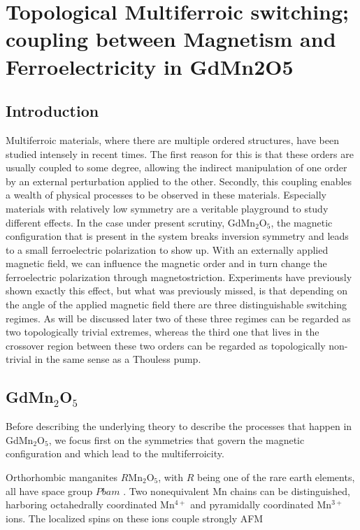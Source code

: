 \chapter{Topological Multiferroic switching; coupling between Magnetism and Ferroelectricity in GdMn2O5}
\section{Introduction}
Multiferroic materials, where there are multiple ordered structures, have been studied intensely in recent times. The first reason for this is that these orders are usually coupled to some degree, allowing the indirect manipulation of one order by an external perturbation applied to the other. Secondly, this coupling enables a wealth of physical processes to be observed in these materials. Especially materials with relatively low symmetry are a veritable playground to study different effects. In the case under present scrutiny, GdMn$_2$O$_5$, the magnetic configuration that is present in the system breaks inversion symmetry and leads to a small ferroelectric polarization to show up. With an externally applied magnetic field, we can influence the magnetic order and in turn change the ferroelectric polarization through magnetostriction. Experiments have previously shown exactly this effect, but what was previously missed, is that depending on the angle of the applied magnetic field there are three distinguishable switching regimes. As will be discussed later two of these three regimes can be regarded as two topologically trivial extremes, whereas the third one that lives in the crossover region between these two orders can be regarded as topologically non-trivial in the same sense as a Thouless pump.

\section{GdMn$_2$O$_5$}
Before describing the underlying theory to describe the processes that happen in GdMn$_2$O$_5$, we focus first on the symmetries that govern the magnetic configuration and which lead to the multiferroicity.

Orthorhombic manganites $R$Mn$_2$O$_5$, with $R$ being one of the rare earth elements, all have space group $Pbam$ \cite{Alfonso97a}. Two nonequivalent Mn chains can be distinguished, harboring octahedrally coordinated Mn$^{4+}$ and pyramidally coordinated Mn$^{3+}$ ions. The localized spins on these ions couple strongly AFM 

